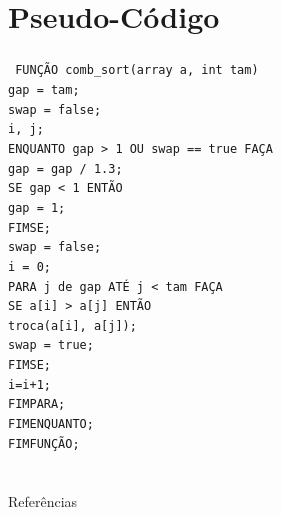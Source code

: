 \documentclass[aspectratio=169,table]{beamer}
\begin{document}
\section{Pseudo-Código}
	\begin{frame}
		\frametitle{\secname}
		\texttt{%
			\scriptsize
			FUNÇÃO comb\_sort(array a, int tam)\\
			\qquad gap = tam;\\
			\qquad swap = false;\\
			\qquad i, j;\\
			\qquad ENQUANTO gap > 1 OU swap == true FAÇA\\
			\qquad \qquad gap = gap / 1.3;\\
			\qquad \qquad SE gap < 1 ENTÃO\\
			\qquad \qquad \qquad gap = 1;\\
			\qquad \qquad FIMSE;\\
			\qquad \qquad swap = false;\\
			\qquad \qquad i = 0;\\
			\qquad \qquad PARA j de gap ATÉ j < tam FAÇA\\
			\qquad \qquad \qquad SE a[i] > a[j] ENTÃO\\
			\qquad \qquad \qquad \qquad troca(a[i], a[j]);\\
			\qquad \qquad \qquad \qquad swap = true;\\
			\qquad \qquad \qquad FIMSE;\\
			\qquad \qquad \qquad i=i+1;\\
			\qquad \qquad FIMPARA;\\
			\qquad FIMENQUANTO;\\
			FIMFUNÇÃO;\\
		}
	\end{frame}

\section*{}

\begin{frame}{Referências}
	
\end{frame}

\end{document}
